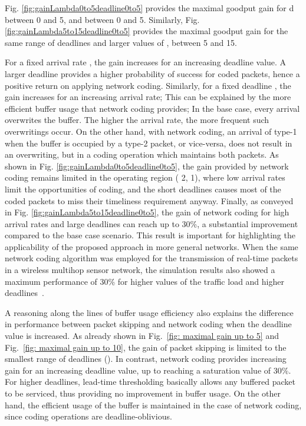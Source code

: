 \documentclass[preprint,12pt]{elsarticle}
\theoremstyle{definition}
\theoremstyle{plain}
\theoremstyle{remark}
\begin{document}
Fig. \ref{fig:gainLambda0to5deadline0to5} provides the maximal goodput gain for d between 0 and 5, and
 between 0 and 5. Similarly, Fig. \ref{fig:gainLambda5to15deadline0to5} provides the maximal goodput gain for the same range of deadlines and larger values of  , between 5 and 15.

For a fixed arrival rate , the gain increases for an increasing deadline value. A larger deadline provides a higher probability of success for coded packets, hence a positive return on applying network coding. Similarly, for a fixed deadline , the gain increases for an increasing arrival rate; This can be explained by the more efficient buffer usage that network coding provides; In the base case, every arrival overwrites the buffer. The higher the arrival rate, the more frequent such overwritings occur. On the other hand, with network coding, an arrival of type-1 when the buffer is occupied by a type-2 packet, or vice-versa, does not result in an overwriting, but in a coding operation which maintains both packets.
As shown in Fig. \ref{fig:gainLambda0to5deadline0to5}, the gain provided by network coding remains limited in the operating region (  2,   1), where low arrival rates limit the opportunities of coding, and the short deadlines causes most of the coded packets to miss their timeliness requirement anyway.
Finally, as conveyed in Fig. \ref{fig:gainLambda5to15deadline0to5}, the gain of network coding for high arrival rates and large deadlines can reach up to 30\%, a substantial improvement compared to the base case scenario. This result is important for highlighting the applicability of the proposed approach in more general networks. When the same network coding algorithm was employed for the transmission of real-time packets in a wireless multihop sensor network, the simulation results also showed a maximum performance of 30\% for higher values of the traffic load and higher deadlines~\cite{aoun-ewsn2011}.

A reasoning along the lines of buffer usage efficiency also explains the difference in performance between packet skipping and network coding when the deadline value is increased. As already shown in Fig.~\ref{fig: maximal gain up to 5} and Fig.~\ref{fig: maximal gain up to 10}, the gain of packet skipping is limited to the smallest range of deadlines (). In contrast, network coding provides increasing gain for an increasing deadline value, up to reaching a saturation value of 30\%. For higher deadlines, lead-time thresholding basically allows any buffered packet to be serviced, thus providing no improvement in buffer usage. On the other hand, the efficient usage of the buffer is maintained in the case of network coding, since coding operations are deadline-oblivious.
\end{document}
